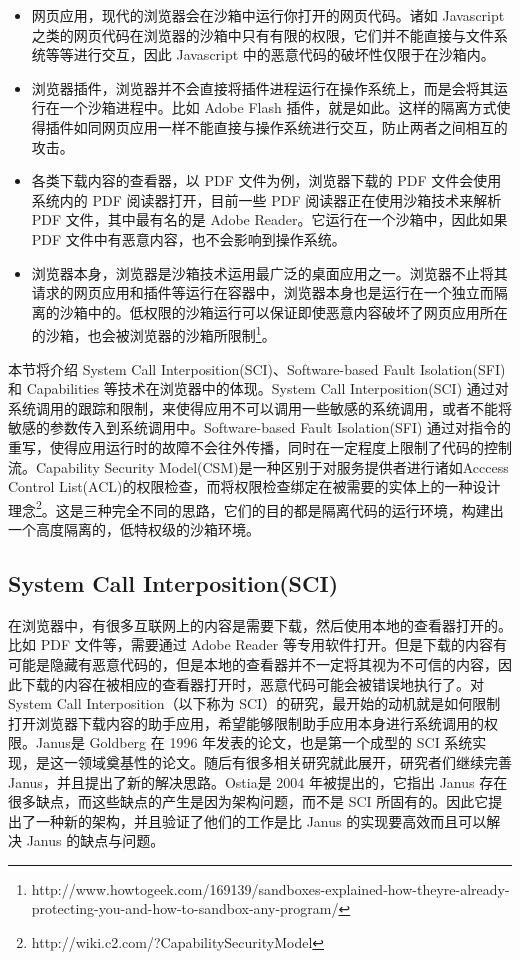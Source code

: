 \documentclass[preprint,12pt]{elsarticle}
\begin{document}
\begin{itemize}
\item
网页应用，现代的浏览器会在沙箱中运行你打开的网页代码。诸如 Javascript 之类的网页代码在浏览器的沙箱中只有有限的权限，它们并不能直接与文件系统等等进行交互，因此 Javascript 中的恶意代码的破坏性仅限于在沙箱内。
\item
浏览器插件，浏览器并不会直接将插件进程运行在操作系统上，而是会将其运行在一个沙箱进程中。比如 Adobe Flash 插件，就是如此。这样的隔离方式使得插件如同网页应用一样不能直接与操作系统进行交互，防止两者之间相互的攻击。
\item
各类下载内容的查看器，以 PDF 文件为例，浏览器下载的 PDF 文件会使用系统内的 PDF 阅读器打开，目前一些 PDF 阅读器正在使用沙箱技术来解析 PDF 文件，其中最有名的是 Adobe Reader。它运行在一个沙箱中，因此如果 PDF 文件中有恶意内容，也不会影响到操作系统。
\item
浏览器本身，浏览器是沙箱技术运用最广泛的桌面应用之一。浏览器不止将其请求的网页应用和插件等运行在容器中，浏览器本身也是运行在一个独立而隔离的沙箱中的。低权限的沙箱运行可以保证即使恶意内容破坏了网页应用所在的沙箱，也会被浏览器的沙箱所限制\footnote{http://www.howtogeek.com/169139/sandboxes-explained-how-theyre-already-protecting-you-and-how-to-sandbox-any-program/}。
\end{itemize}

本节将介绍 System Call Interposition(SCI)、Software-based Fault Isolation(SFI) 和 Capabilities 等技术在浏览器中的体现。System Call Interposition(SCI) 通过对系统调用的跟踪和限制，来使得应用不可以调用一些敏感的系统调用，或者不能将敏感的参数传入到系统调用中。Software-based Fault Isolation(SFI) 通过对指令的重写，使得应用运行时的故障不会往外传播，同时在一定程度上限制了代码的控制流。Capability Security Model(CSM)是一种区别于对服务提供者进行诸如Acccess Control List(ACL)的权限检查，而将权限检查绑定在被需要的实体上的一种设计理念\footnote{http://wiki.c2.com/?CapabilitySecurityModel}。这是三种完全不同的思路，它们的目的都是隔离代码的运行环境，构建出一个高度隔离的，低特权级的沙箱环境。

\subsection{System Call Interposition(SCI)}
\label{ss:sci}

在浏览器中，有很多互联网上的内容是需要下载，然后使用本地的查看器打开的。比如 PDF 文件等，需要通过 Adobe Reader 等专用软件打开。但是下载的内容有可能是隐藏有恶意代码的，但是本地的查看器并不一定将其视为不可信的内容，因此下载的内容在被相应的查看器打开时，恶意代码可能会被错误地执行了。对 System Call Interposition（以下称为 SCI）的研究，最开始的动机就是如何限制打开浏览器下载内容的助手应用，希望能够限制助手应用本身进行系统调用的权限。Janus\cite{goldberg}是 Goldberg 在 1996 年发表的论文，也是第一个成型的 SCI 系统实现，是这一领域奠基性的论文。随后有很多相关研究就此展开，研究者们继续完善 Janus，并且提出了新的解决思路。Ostia\cite{garfinkel}是 2004 年被提出的，它指出 Janus 存在很多缺点，而这些缺点的产生是因为架构问题，而不是 SCI 所固有的。因此它提出了一种新的架构，并且验证了他们的工作是比 Janus 的实现要高效而且可以解决 Janus 的缺点与问题。
\end{document}
